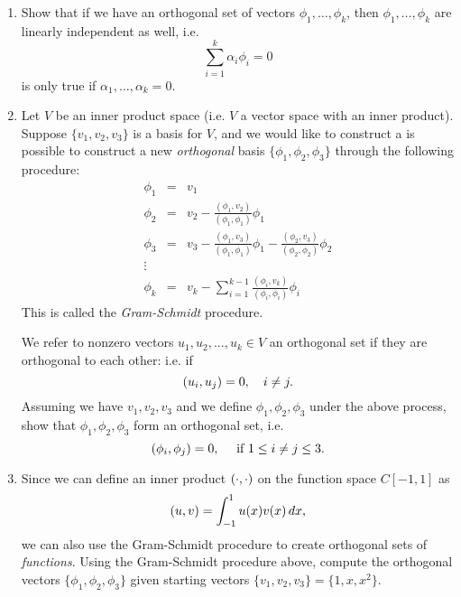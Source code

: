 
\begin{enumerate}
\item Show that if we have an orthogonal set of vectors $\phi_1,\ldots, \phi_k$, then $\phi_1,\ldots, \phi_k$ are linearly independent as well, i.e. 
\[
\sum_{i = 1}^k \alpha_i\phi_i = 0
\]
is only true if $\alpha_1, \ldots, \alpha_k = 0$. 
\item Let $ V$ be an inner product space (i.e. $V$ a vector space with an inner product). Suppose  $ \{{v}_1, {v}_2, { v}_3\} $ is a basis for $V$, and we would like to construct a is possible to construct a new \emph{orthogonal} basis $ \{{ \phi}_1, { \phi}_2, { \phi}_3 \}$ through the following procedure:
\begin{eqnarray*}
{ \phi}_1 &=& { v}_1 \\
{ \phi}_2 &=& { v}_2-\frac{({ \phi}_1, { v}_2)}{({ \phi}_1, { \phi}_1)} { \phi}_1\\
{ \phi}_3 &=& { v}_3-\frac{({ \phi}_1, { v}_3)}{({ \phi}_1, { \phi}_1)} { \phi}_1 - \frac{({ \phi}_2, { v}_3)}{({ \phi}_2, { \phi}_2)} { \phi}_2\\
\vdots\\
{ \phi}_k &=& { v}_k- \sum_{i = 1}^{k-1}\frac{({ \phi}_i, { v}_k)}{({ \phi}_i, { \phi}_i)} { \phi}_i
\end{eqnarray*}
This is called the \emph{Gram-Schmidt} procedure.  

We refer to nonzero vectors $u_1, u_2, . . . , u_k \in V$ an orthogonal set if they are orthogonal to each other: i.e. if 
\[
(u_i, u_j) = 0, \quad i\neq j.
\]
Assuming we have $v_1, v_2, v_3$ and we define $\phi_1, \phi_2, \phi_3$ under the above process, show that $\phi_1,\phi_2,\phi_3$ form an orthogonal set, i.e. 
\[
(\phi_i, \phi_j)=0, \quad \text{ if } 1 \leq i \neq j\leq 3.  
\]
\item Since we can define an inner product $(\cdot,\cdot)$ on the function space $C[-1,1]$ as
\[
(u,v) = \int_{-1}^1 u(x)v(x)\, dx,
\]
we can also use the Gram-Schmidt procedure to create orthogonal sets of \emph{functions}.  Using the Gram-Schmidt procedure above, compute the orthogonal vectors $ \{{\phi}_1, {\phi}_2, { \phi}_3\} $ given starting vectors $\{v_1, v_2, v_3\}=\{1, x, x^2\}$.  

\end{enumerate}

 



